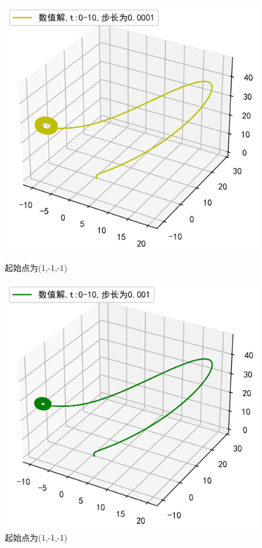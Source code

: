 \documentclass[a4paper]{article}%
\begin{document}
\begin{figure}[h]
    \begin{minipage}{0.48\linewidth}
    \centering
    \includegraphics[scale=0.65]{71}
    \caption{起始点为(1,-1,-1)}
    \end{minipage}
    \begin{minipage}{0.48\linewidth}
    \centering
    \includegraphics[scale=0.65]{72}
    \caption{起始点为(1,-1,-1)}
    \end{minipage}
\end{figure}
\end{document}
